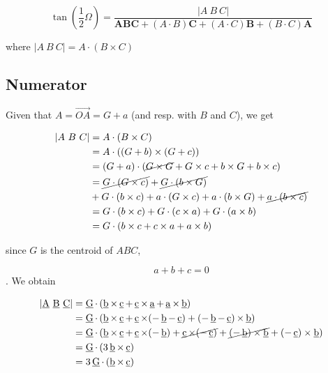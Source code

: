 \documentclass[10pt,a4paper]{article}
\newcommand{\ud}[1]{\underline{#1}}
\DeclareMathOperator{\tm}{\times}
\DeclareMathOperator{\A}{\ud{A}}
\DeclareMathOperator{\B}{\ud{B}}
\DeclareMathOperator{\C}{\ud{C}}
\DeclareMathOperator{\G}{\ud{G}}
\DeclareMathOperator{\av}{\ud{a}}
\DeclareMathOperator{\bv}{\ud{b}}
\DeclareMathOperator{\cv}{\ud{c}}
\begin{document}
$$
{\displaystyle \tan \left({\frac {1}{2}}\Omega \right)
  = {\frac {\left|{A}\ {B}\ {C}\right|}
    {\mathbf{A}\mathbf{B}\mathbf{C} + \left({A}\cdot {B}\right)\mathbf{C}
      + \left({A}\cdot {C}\right)\mathbf{B}
      + \left({B}\cdot {C}\right)\mathbf{A}}}}
$$

where $ \left|{A}\ {B}\ {C}\right|={A}\cdot ({B}\times {C}) $


\subsection{Numerator}


Given that $A = \vec{OA} = G + a$ (and resp.
with $B$ and $C$), we get


\begin{align*}
\left|{A}\ {B}\ {C}\right|
	& =  {A} \cdot ({B}\times {C}) \\
	& =  {A} \cdot ({(G + b)} \times {(G + c)}) \\
	& =  {(G + a)} \cdot (\cancel{G \times G}
	                      + G \times c
	                      + b \times G
	                      + b \times c) \\
	& = \cancel{G \cdot (G \times c)}
	                      + \cancel{G \cdot (b \times G)}\\
         & + G \cdot (b \times c)
	  + a \cdot (G \times c)
	  + a \cdot (b \times G)
	  + \cancel{a \cdot (b \times c)} \\
	& = G \cdot (b \times c)
	+ G \cdot (c \times a)
	+ G \cdot (a \times b) \\
	& = G \cdot \left(b \times c
	+c \times a
	+ a \times b \right)
\end{align*}

since $G$ is the centroid of $ABC$, 

\begin{equation}
a + b + c= 0
\label{eq1}
\end{equation}. We obtain



\begin{align}
\left|{\A}\ {\B}\ {\C}\right|
& = \G \cdot \left(\bv \tm \cv + \cv \tm \av + \av \tm \bv \right) \nonumber \\
& = \G \cdot \left(\bv \tm \cv + \cv \tm (-\bv-\cv)	+ (-\bv-\cv) \tm \bv \right) \nonumber \\
& = \G \cdot \left(\bv \times \cv + \cv \times (-\bv) + \cancel{\cv \times (-\cv)}
	+ \cancel{(-\bv) \times \bv} + (- \cv) \times \bv \right) \nonumber \\
& = \G \cdot \left(3 \bv \times \cv \right) \nonumber \\
& = 3 \G \cdot \left( \bv \times \cv \right)
\end{align}
\end{document}
